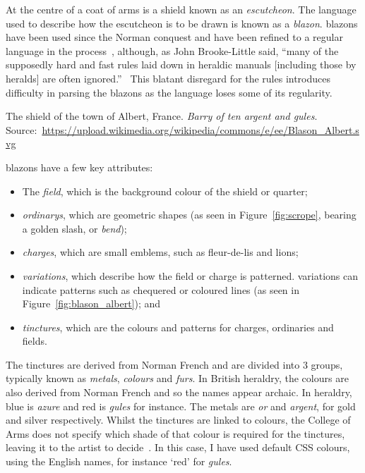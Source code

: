 \documentclass[nobib, a4paper, twoside, justified]{tufte-book}
\makeatletter
\newcommand{\charge}{\gls{charge}\@\xspace}
\newcommand{\charges}{\glspl{charge}\@\xspace}
\newcommand{\quarter}{\gls{quarter}\@\xspace}
\newcommand{\blazon}{\gls{blazon}\@\xspace}
\newcommand{\blazons}{\glspl{blazon}\@\xspace}
\newcommand{\ublazons}{\Glspl{blazon}\@\xspace}
\makeatother
\begin{document}
At the centre of a coat of arms is a shield known as an \textit{\gls{escutcheon}}. The language
used to describe how the escutcheon is to be drawn is known as a \textit{\blazon}.
\ublazons have been used since the Norman conquest and have been refined to a regular language
in the process~\autocite{boutell_1864}, although, as John Brooke-Little said, ``many of the
supposedly hard and fast rules laid down in heraldic manuals [including those by heralds] are often
ignored.''~\autocite{brooke_little_1985} This blatant disregard for the rules introduces
difficulty in parsing the \blazons as the language loses some of its regularity.

\begin{marginfigure}
  \centering
  \def\svgwidth{0.8\linewidth}
  
  \caption{The shield of the town of Albert, France. \textit{Barry of ten argent and
  gules}. Source:~\url{https://upload.wikimedia.org/wikipedia/commons/e/ee/Blason_Albert.svg}}%
  \label{fig:blason_albert}
\end{marginfigure}

\ublazons have a few key attributes:
\begin{itemize}
  \item The \textit{\gls{field}}, which is the background colour of the shield or
    \quarter;
  \item \textit{\Glspl{ordinary}}, which are geometric shapes (as seen in Figure~\ref{fig:scrope},
    bearing a golden slash, or \textit{bend});
  \item \textit{\Glspl{charge}}, which are small emblems, such as fleur-de-lis and lions;
  \item \textit{\Glspl{variation}}, which describe how the field or \charge is patterned.
    \Glspl{variation} can indicate patterns such as chequered or coloured lines (as seen in
    Figure~\ref{fig:blason_albert}); and
  \item \textit{\Glspl{tincture}}, which are the colours and patterns for \charges, ordinaries
    and fields.
\end{itemize}

The tinctures are derived from Norman French and are divided into 3 groups, typically known as
\textit{metals}, \textit{colours} and \textit{furs}. In British heraldry, the colours are also
derived from Norman French and so the names appear archaic. In heraldry, blue is \textit{azure} and
red is \textit{gules} for instance. The metals are \textit{or} and \textit{argent}, for gold and
silver respectively. Whilst the tinctures are linked to colours, the College of Arms does not
specify which shade of that colour is required for the tinctures, leaving it to the artist to
decide~\autocite{college_of_arms_faq}. In this case, I have used default CSS colours, using the
English names, for instance `red' for \textit{gules}.
\end{document}
